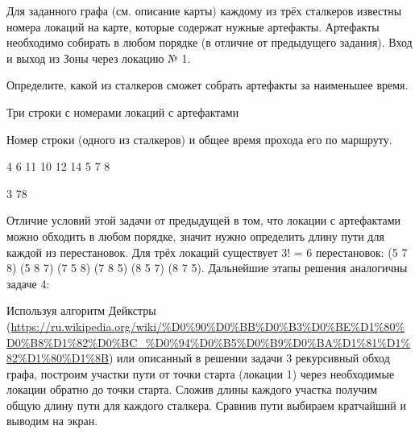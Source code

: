 
Для заданного графа (см. описание карты) каждому из трёх сталкеров известны номера локаций на карте, которые содержат нужные артефакты. Артефакты необходимо собирать в любом порядке (в отличие от предыдущего задания). Вход и выход из Зоны через локацию № 1.

Определите, какой из сталкеров сможет собрать артефакты за наименьшее время.


Три строки с номерами локаций с артефактами

\outputfmtSection

Номер строки (одного из сталкеров) и общее время прохода его по маршруту.

\begin{myverbbox}[\small]{\vinput}
    4 6 11
    10 12 14
    5 7 8
\end{myverbbox}
\begin{myverbbox}[\small]{\voutput}
    3 78
\end{myverbbox}

\explanationSection

Отличие условий этой задачи от предыдущей в том, что локации с артефактами можно обходить в любом порядке, значит нужно определить длину пути для каждой из перестановок. Для трёх локаций существует 3! = 6 перестановок: (5 7 8) (5 8 7) (7 5 8) (7 8 5) (8 5 7) (8 7 5). Дальнейшие этапы решения аналогичны задаче 4:

Используя алгоритм Дейкстры (\url{https://ru.wikipedia.org/wiki/%D0%90%D0%BB%D0%B3%D0%BE%D1%80%D0%B8%D1%82%D0%BC_%D0%94%D0%B5%D0%B9%D0%BA%D1%81%D1%82%D1%80%D1%8B}) или описанный в решении задачи 3 рекурсивный обход графа, построим участки пути от точки старта (локации 1) через необходимые локации обратно до точки старта. Сложив длины каждого участка получим общую длину пути для каждого сталкера. Сравнив пути выбираем кратчайший и выводим на экран.